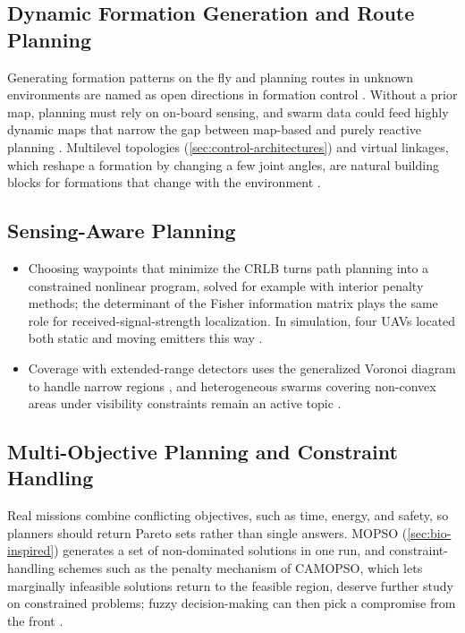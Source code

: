 \subsection{Dynamic Formation Generation and Route Planning}

Generating formation patterns on the fly and planning routes in unknown
environments are named as open directions in formation control
\cite{liu2018virtual,liu2018decentralization}. Without a prior map, planning must
rely on on-board sensing, and swarm data could feed highly dynamic maps that
narrow the gap between map-based and purely reactive planning
\cite{tan2016handbook}. Multilevel topologies (\cref{sec:control-architectures})
and virtual linkages, which reshape a formation by changing a few joint angles,
are natural building blocks for formations that change with the environment
\cite{tan2016handbook,liu2018virtual}.

\subsection{Sensing-Aware Planning}

\begin{itemize}
  \item {} Choosing waypoints that minimize the
        CRLB turns path planning into a constrained nonlinear program, solved for
        example with interior penalty methods; the determinant of the Fisher
        information matrix plays the same role for received-signal-strength
        localization. In simulation, four UAVs located both static and moving
        emitters this way \cite{wang2018optimal}.
  \item {} Coverage with extended-range
        detectors uses the generalized Voronoi diagram to handle narrow regions
        \cite{acar2006sensor}, and heterogeneous swarms covering non-convex areas
        under visibility constraints remain an active topic
        \cite{breitenmoser2010voronoi}.
\end{itemize}

\subsection{Multi-Objective Planning and Constraint Handling}

Real missions combine conflicting objectives, such as time, energy, and safety,
so planners should return Pareto sets rather than single answers. MOPSO
(\cref{sec:bio-inspired}) generates a set of non-dominated solutions in one run,
and constraint-handling schemes such as the penalty mechanism of CAMOPSO, which
lets marginally infeasible solutions return to the feasible region, deserve
further study on constrained problems; fuzzy decision-making can then pick a
compromise from the front \cite{panigrahi2011handbook}.
